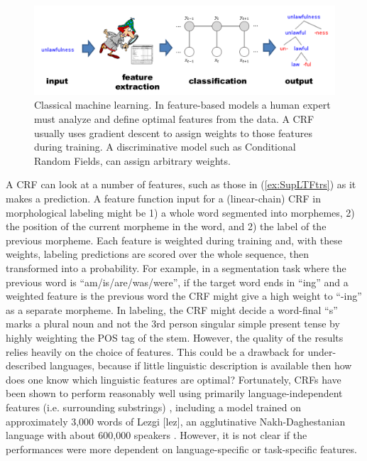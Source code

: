 \documentclass[12pt]{article}
\begin{document}
 \begin{figure}[t]
\begin{center}
\includegraphics[width=0.95\columnwidth]{Features-ML.PNG}
\caption{Classical machine learning. In feature-based models a human expert must analyze and define optimal features from the data. A CRF usually uses gradient descent to assign weights to those features during training. A discriminative model such as Conditional Random Fields, can assign arbitrary weights.}
\label{fig:Features-ML}
\end{center}
\end{figure}

A CRF can look at a number of features, such as those in (\ref{ex:SupLTFtrs}) as it makes a prediction. A feature function input for a (linear-chain) CRF in morphological labeling might be 1) a whole word segmented into morphemes, 2) the position of the current morpheme in the word, and 2) the label of the previous morpheme. Each feature is weighted during training and, with these weights, labeling predictions are scored over the whole sequence, then transformed into a probability. For example, in a segmentation task where the previous word is ``am/is/are/was/were'', if the target word ends in ``ing'' and a weighted feature is the previous word the CRF might give a high weight to ``-ing'' as a separate morpheme. In labeling, the CRF might decide a word-final ``s'' marks a plural noun and not the 3rd person singular simple present tense by highly weighting the POS tag of the stem. However, the quality of the results relies heavily on the choice of features. This could be a drawback for under-described languages, because if little linguistic description is available then how does one know which linguistic features are optimal? Fortunately, CRFs have been shown to perform reasonably well using primarily language-independent features (i.e. surrounding substrings) \cite{ruokolainen_comparative_2016,moeller_automatic_2018}, including a model trained on approximately 3,000 words of Lezgi [lez], an agglutinative Nakh-Daghestanian language with about 600,000 speakers \cite{eberhard_ethnologue:2020}. However, it is not  clear if the performances were more dependent on language-specific or task-specific features.
 
\end{document}
